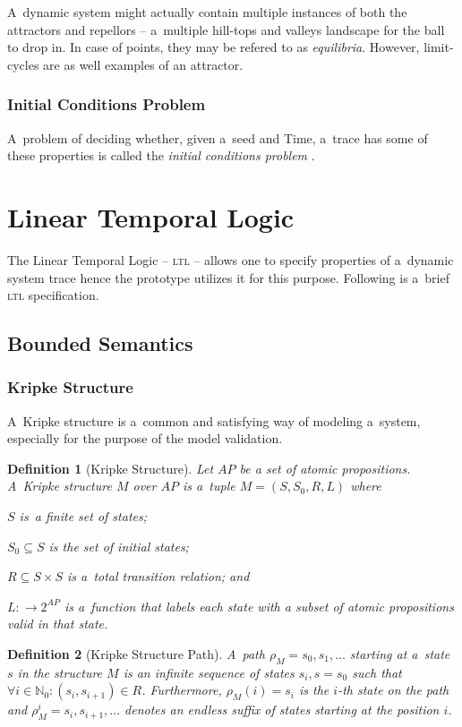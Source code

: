\documentclass[12pt,oneside,draft]{fithesis}
\newcommand{\mNatural}{\mathbb{N}}
\newtheorem{mydef}{Definition}
\begin{document}
A~dynamic system might actually contain multiple instances of both the
attractors and repellors -- a~multiple hill-tops and valleys landscape
for the ball to drop in. In case of points, they may be refered to as
\emph{equilibria}. However, limit-cycles are as well examples of an
attractor.
\subsubsection{Initial Conditions Problem}
A~problem of deciding whether, given a~seed and Time, a~trace has some
of these properties is called the \emph{initial conditions problem}
\cite{sven}.

\section{Linear Temporal Logic}
The Linear Temporal Logic -- \textsc{ltl} -- allows one to specify
properties of a~dynamic system trace \cite{sven} hence the prototype
utilizes it for this purpose. Following is a~brief
\textsc{ltl} specification.
\subsection{Bounded Semantics}
\subsubsection{Kripke Structure}
A~Kripke structure is a~common and satisfying way of modeling a~system,
especially for the purpose of the model validation\cite{clarke}.
\begin{mydef}[Kripke Structure]
Let ${AP}$ be a set of atomic propositions.
A~Kripke structure\cite{clarke} $M$ over $AP$ is a~tuple
$M=(S, S_0, R, L)$ where
\begin{inparaenum}
	\item{}$S$ is~a finite set of states;
	\item{}$S_0\subseteq{}S$ is the set of initial states;
	\item{}$R\subseteq{}S\times{}S$ is a~total transition relation; and
	\item{}$L:\rightarrow{}2^{AP}$ is a~function that labels each state
		with a subset of atomic propositions valid in that state.
\end{inparaenum}
\end{mydef}

\begin{mydef}[Kripke Structure Path]
A~path\cite{biere} $\rho_M=s_0,s_1,\dotsc$ starting at a~state
$s$ in the structure $M$ is an infinite sequence of states
$s_i, s = s_0$ such that
$\forall i \in \mNatural_0: (s_i, s_{i+1}) \in R$.
Furthermore, $\rho_M(i)=s_i$ is the $i$-th state on the path and
$\rho_M^i=s_i,s_{i+1},\dotsc$ denotes an endless suffix of states
starting at the position $i$.
\end{mydef}
\end{document}
